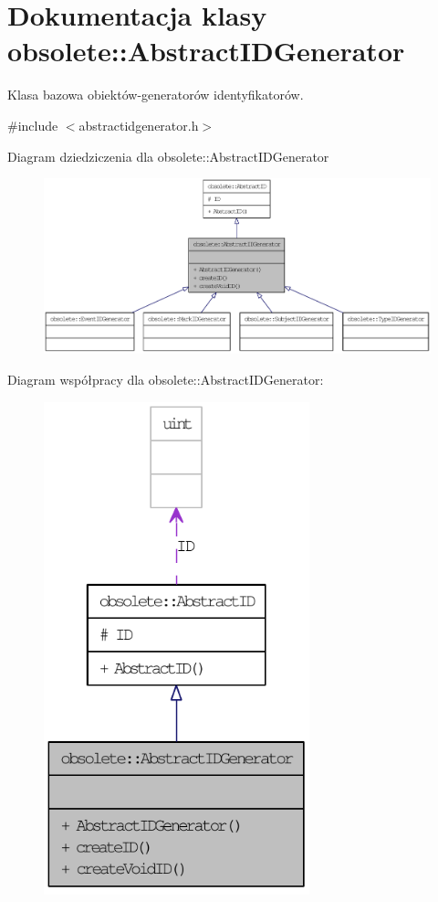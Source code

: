 \hypertarget{classobsolete_1_1AbstractIDGenerator}{
\section{Dokumentacja klasy obsolete::AbstractIDGenerator}
\label{classobsolete_1_1AbstractIDGenerator}
}


Klasa bazowa obiektów-\/generatorów identyfikatorów.  




{\ttfamily \#include $<$abstractidgenerator.h$>$}



Diagram dziedziczenia dla obsolete::AbstractIDGenerator\nopagebreak
\begin{figure}[H]
\begin{center}
\leavevmode
\includegraphics[width=400pt]{classobsolete_1_1AbstractIDGenerator__inherit__graph}
\end{center}
\end{figure}


Diagram współpracy dla obsolete::AbstractIDGenerator:\nopagebreak
\begin{figure}[H]
\begin{center}
\leavevmode
\includegraphics[width=218pt]{classobsolete_1_1AbstractIDGenerator__coll__graph}
\end{center}
\end{figure}
